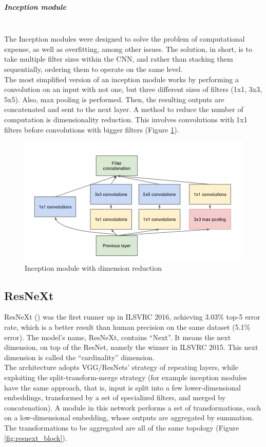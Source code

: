 \documentclass{article}
\begin{document}
\subparagraph{Inception module}\mbox{}\\
The Inception modules were designed to solve the problem of computational expense, as well as overfitting, among other issues. The solution, in short, is to take multiple filter sizes within the CNN, and rather than stacking them sequentially, ordering them to operate on the same level. \\
 The most simplified version of an inception module works by performing a convolution on an input with not one, but three different sizes of filters (1x1, 3x3, 5x5). Also, max pooling is performed. Then, the resulting outputs are concatenated and sent to the next layer.
A method to reduce the number of computation is dimensionality reduction. This involves convolutions with 1x1 filters before convolutions with bigger filters (Figure \ref{fig:incmodule}).
\newpage
\begin{figure}[h]
	\centering
	\includegraphics[width=0.5\linewidth]{image/inc_module}
	\caption{Inception module with dimension reduction}
	\label{fig:incmodule}
\end{figure}




\subsection{ResNeXt}
ResNeXt (\cite{resneXt}) was the first runner up in ILSVRC 2016, achieving 3.03\% top-5 error rate, which is a better result than human precision on the same dataset (5.1\% error). The model's name, ResNeXt, contains “Next”. It means the next dimension, on top of the ResNet, namely the winner in ILSVRC 2015. This next dimension is called the “cardinality” dimension.\\
The architecture adopts VGG/ResNets' strategy of repeating layers, while
exploiting the split-transform-merge strategy (for example inception modules have the same approach, that is, input is split into a few lower-dimensional embeddings, transformed by a set of specialized filters, and merged by concatenation). 
A module in this network performs a set of transformations, each on a low-dimensional embedding, whose outputs are aggregated by summation. The transformations to be aggregated are all of the same topology (Figure \ref{fig:resnext_block}).\\
\end{document}
